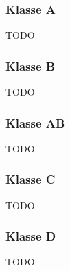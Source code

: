 \subsubsection{Klasse A}
TODO

\subsubsection{Klasse B}
TODO

\subsubsection{Klasse AB}
TODO

\subsubsection{Klasse C}
TODO

\subsubsection{Klasse D}
TODO
